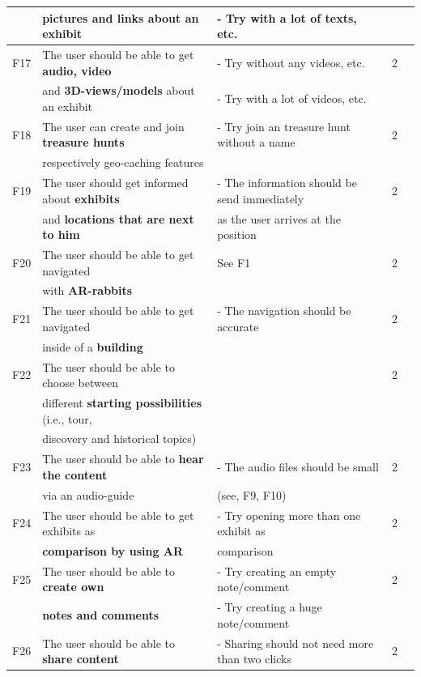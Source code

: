 {\begin{landscape}
\begin{center}
\begin{longtable}{|l|l|lll|}
		& \textbf{pictures} and links about an exhibit				& - Try with a lot of texts, etc.  	& \\
	\hline
	F17 & The user should be able to get \textbf{audio, video}  		& - Try without any videos, etc.    & 2\\
		& and \textbf{3D-views/models} about an exhibit			& - Try with a lot of videos, etc.  	& \\
	\hline
	F18 & The user can create and join \textbf{treasure hunts} 		& - Try join an treasure hunt without a name & 2\\
		& respectively geo-caching features					&	& \\
	\hline
	F19 & The user should get informed about \textbf{exhibits} 		& - The information should be send immediately  & 2\\
		& and \textbf{locations that are next to him}				& as the user arrives at the position		& \\
	\hline
	F20 & The user should be able to get navigated 				& See F1  & 2\\
		& with \textbf{AR-rabbits} 							&		& \\
	\hline
	F21 & The user should be able to get navigated  				& - The navigation should be accurate   & 2\\
		& inside of a \textbf{building}							&	& \\
	\hline
	F22 & The user should be able to choose between 			&    & 2\\
		& different \textbf{starting possibilities} (i.e., tour, 			&	& \\
		& discovery and historical topics) 						&	& \\
	\hline
	F23 & The user should be able to \textbf{hear the content} 		& - The audio files should be small  & 2\\
		& via an audio-guide								& (see, F9, F10)	& \\
	\hline
	F24 & The user should be able to get exhibits as 				&  - Try opening more than one exhibit as& 2\\
		& \textbf{comparison by using AR}						& comparison	& \\ 
	\hline
	F25 & The user should be able to \textbf{create own} 			& - Try creating an empty note/comment  & 2\\
		& \textbf{notes and comments}						& - Try creating a huge note/comment	& \\
	\hline
	F26 & The user should be able to \textbf{share content} 		& - Sharing should not need more than two clicks & 2\\

\end{longtable}
\end{center}
\end{landscape}}
